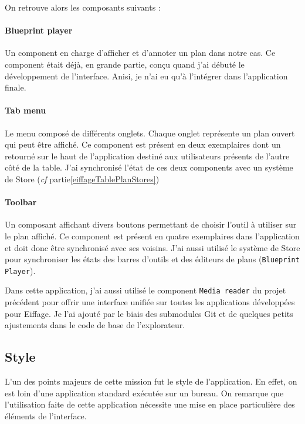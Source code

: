 On retrouve alors les composants suivants :

\paragraph{Blueprint player} Un component en charge d'afficher et d'annoter un plan dans notre cas.
Ce component était déjà, en grande partie, conçu quand j'ai débuté le développement de l'interface.
Anisi, je n'ai eu qu'à l'intégrer dans l'application finale.

\paragraph{Tab menu} Le menu composé de différents onglets.
Chaque onglet représente un plan ouvert qui peut être affiché.
Ce component est présent en deux exemplaires dont un retourné sur le haut de l'application destiné aux utilisateurs présents de l'autre côté de la table.
J'ai synchronisé l'état de ces deux components avec un système de Store (\emph{cf} partie\ref{eiffageTablePlanStores})

\paragraph{Toolbar} Un composant affichant divers boutons permettant de choisir l'outil à utiliser sur le plan affiché.
Ce component est présent en quatre exemplaires dans l'application et doit donc être synchronisé avec ses voisins.
J'ai aussi utilisé le système de Store pour synchroniser les états des barres d'outils et des éditeurs de plans (\texttt{Blueprint Player}).

\bigskip

Dans cette application, j'ai aussi utilisé le component \texttt{Media reader} du projet précédent pour offrir une interface unifiée sur toutes les applications développées pour Eiffage.
Je l'ai ajouté par le biais des submodules Git et de quelques petits ajustements dans le code de base de l'explorateur.

\subsection{Style}
\label{eiffageTablePlanStyle}

L'un des points majeurs de cette mission fut le style de l'application.
En effet, on est loin d'une application standard exécutée sur un bureau.
On remarque que l'utilisation faite de cette application nécessite une mise en place particulière des éléments de l'interface.

